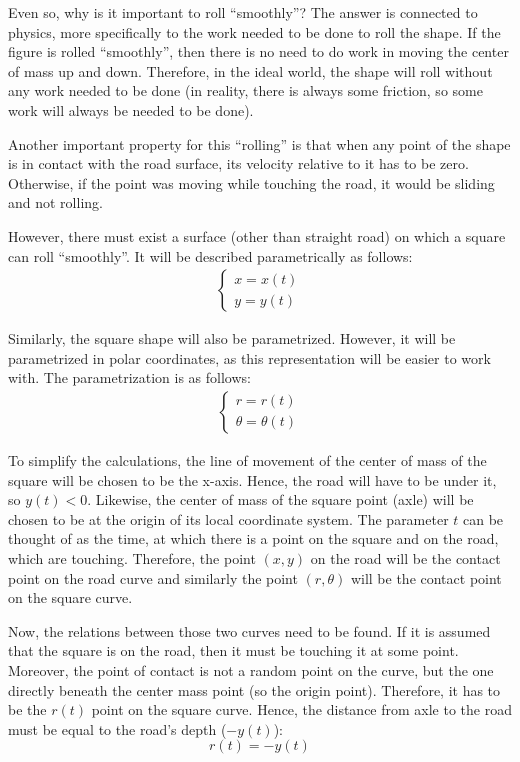 \documentclass[12pt]{article}
\begin{document}
        Even so, why is it important to roll ``smoothly''? The answer is connected to physics, more specifically to the work needed to be done to roll the shape. If the figure is rolled ``smoothly'', then there is no need to do work in moving the center of mass up and down. Therefore, in the ideal world, the shape will roll without any work needed to be done (in reality, there is always some friction, so some work will always be needed to be done).

        Another important property for this ``rolling'' is that when any point of the shape is in contact with the road surface, its velocity relative to it has to be zero. Otherwise, if the point was moving while touching the road, it would be sliding and not rolling.

        However, there must exist a surface (other than straight road) on which a square can roll ``smoothly''. It will be described parametrically as follows:
        \begin{align}
            \begin{cases}
            x = x(t) \\
            y = y(t)
            \end{cases}
        \end{align}

        Similarly, the square shape will also be parametrized. However, it will be parametrized in polar coordinates, as this representation will be easier to work with. The parametrization is as follows: 
        \begin{align}
            \begin{cases}
            r = r(t) \\
            \theta = \theta(t)
            \end{cases}
        \end{align}

        To simplify the calculations, the line of movement of the center of mass of the square will be chosen to be the x-axis. Hence, the road will have to be under it, so $y(t) < 0$. Likewise, the center of mass of the square point (axle) will be chosen to be at the origin of its local coordinate system. The parameter $t$ can be thought of as the time, at which there is a point on the square and on the road, which are touching. Therefore, the point $(x, y)$ on the road will be the contact point on the road curve and similarly the point $(r, \theta)$ will be the contact point on the square curve.

        Now, the relations between those two curves need to be found. If it is assumed that the square is on the road, then it must be touching it at some point. Moreover, the point of contact is not a random point on the curve, but the one directly beneath the center mass point (so the origin point). Therefore, it has to be the $r(t)$ point on the square curve. Hence, the distance from axle to the road must be equal to the road's depth ($-y(t)$):
        \begin{equation}
            r(t) = - y(t)
        \end{equation}
\end{document}
